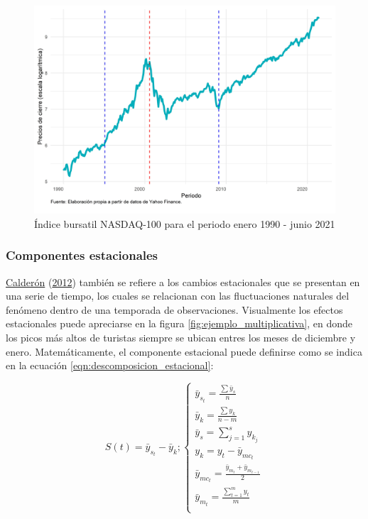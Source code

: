 \documentclass[
]{article}
\begin{document}
\begin{figure}[H]
\includegraphics[width=1\linewidth,height=1\textheight]{Tesis_files/figure-latex/ejemplo_ciclo-1} \caption{Índice bursatil NASDAQ-100 para el periodo enero 1990 - junio 2021}\label{fig:ejemplo_ciclo}
\end{figure}

\subsubsection{Componentes estacionales}

\protect\hyperlink{ref-calderon2012estadistica}{Calderón}
(\protect\hyperlink{ref-calderon2012estadistica}{2012}) también se
refiere a los cambios estacionales que se presentan en una serie de
tiempo, los cuales se relacionan con las fluctuaciones naturales del
fenómeno dentro de una temporada de observaciones. Visualmente los
efectos estacionales puede apreciarse en la figura
\ref{fig:ejemplo_multiplicativa}, en donde los picos más altos de
turistas siempre se ubican entres los meses de diciembre y enero.
Matemáticamente, el componente estacional puede definirse como se indica
en la ecuación \ref{eqn:descomposicion_estacional}:

\begin{equation}
\label{eqn:descomposicion_estacional}
S(t)=\bar{y}_{s_t}-\bar{y}_{k};
\begin{cases}
\bar{y}_{s_t} = \frac{\sum \bar{y}_s}{n} \\
\bar{y}_k = \frac{\sum y_k}{n-m} \\
\bar{y}_s = \sum_{j=1}^s y_{k_j} \\
y_k = y_t - \bar{y}_{mc_t} \\
\bar{y}_{mc_t} = \frac{\bar{y}_{m_t} + \bar{y}_{m_{t-1}}}{2} \\
\bar{y}_{m_t} = \frac{\sum_{t=1}^m y_t}{m} \\
\end{cases}
\end{equation}
\end{document}
